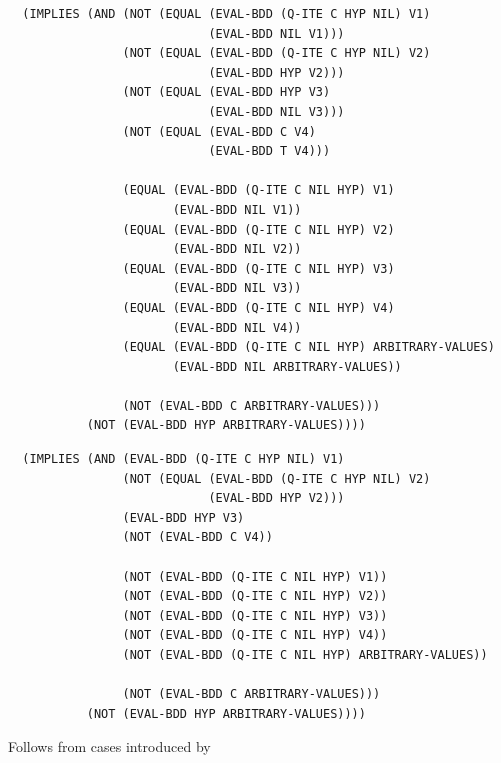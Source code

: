 \begin{frame}[fragile]

{\footnotesize \begin{verbatim}
  (IMPLIES (AND (NOT (EQUAL (EVAL-BDD (Q-ITE C HYP NIL) V1)
                            (EVAL-BDD NIL V1)))
                (NOT (EQUAL (EVAL-BDD (Q-ITE C HYP NIL) V2)
                            (EVAL-BDD HYP V2)))
                (NOT (EQUAL (EVAL-BDD HYP V3)
                            (EVAL-BDD NIL V3)))
                (NOT (EQUAL (EVAL-BDD C V4)
                            (EVAL-BDD T V4)))

                (EQUAL (EVAL-BDD (Q-ITE C NIL HYP) V1)
                       (EVAL-BDD NIL V1))
                (EQUAL (EVAL-BDD (Q-ITE C NIL HYP) V2)
                       (EVAL-BDD NIL V2))
                (EQUAL (EVAL-BDD (Q-ITE C NIL HYP) V3)
                       (EVAL-BDD NIL V3))
                (EQUAL (EVAL-BDD (Q-ITE C NIL HYP) V4)
                       (EVAL-BDD NIL V4))
                (EQUAL (EVAL-BDD (Q-ITE C NIL HYP) ARBITRARY-VALUES)
                       (EVAL-BDD NIL ARBITRARY-VALUES))

                (NOT (EVAL-BDD C ARBITRARY-VALUES)))
           (NOT (EVAL-BDD HYP ARBITRARY-VALUES))))
\end{verbatim}}

\end{frame}


\begin{frame}[fragile]

{\small \begin{verbatim}
  (IMPLIES (AND (EVAL-BDD (Q-ITE C HYP NIL) V1)
                (NOT (EQUAL (EVAL-BDD (Q-ITE C HYP NIL) V2)
                            (EVAL-BDD HYP V2)))
                (EVAL-BDD HYP V3)
                (NOT (EVAL-BDD C V4))

                (NOT (EVAL-BDD (Q-ITE C NIL HYP) V1))
                (NOT (EVAL-BDD (Q-ITE C NIL HYP) V2))
                (NOT (EVAL-BDD (Q-ITE C NIL HYP) V3))
                (NOT (EVAL-BDD (Q-ITE C NIL HYP) V4))
                (NOT (EVAL-BDD (Q-ITE C NIL HYP) ARBITRARY-VALUES))

                (NOT (EVAL-BDD C ARBITRARY-VALUES)))
           (NOT (EVAL-BDD HYP ARBITRARY-VALUES))))
\end{verbatim}}

Follows from cases introduced by 

\end{frame}


